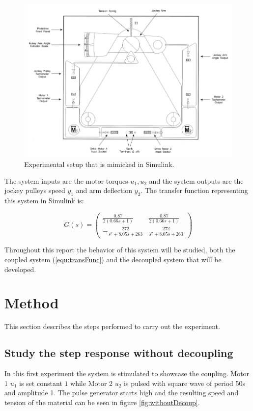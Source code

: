 \documentclass[a4paper, titlepage]{article}
\begin{document}
\begin{figure}[h!]
\center
\includegraphics[scale=0.65]{../figures/experimentSystem.png}
\caption{Experimental setup that is mimicked in Simulink.}
\label{fig:expSys}
\end{figure}

The system inputs are the motor torques $u_1, u_2$ and the system outputs are the jockey pulleys speed $y_1$ and arm deflection $y_2$.
The transfer function representing this system in Simulink is:

\begin{equation}
G(s) = 
\begin{pmatrix}
\frac{0.87}{2(0.66s + 1)} & \frac{0.87}{2(0.66s + 1)} \\[6pt]
-\frac{272}{s^2 + 8.05s + 263} & \frac{272}{s^2 + 8.05s + 263}
\end{pmatrix}
\label{equ:transFunc}
\end{equation}

Throughout this report the behavior of this system will be studied, both the coupled system (\ref{equ:transFunc}) and the decoupled system that will be developed.




\section{Method}
This section describes the steps performed to carry out the experiment.

\subsection{Study the step response without decoupling}
In this first experiment the system is stimulated to showcase the coupling.
Motor 1 $u_1$ is set constant $1$ while Motor 2 $u_2$ is pulsed with square wave of period 50s and amplitude 1.
The pulse generator starts high and the resulting speed and tension of the material can be seen in figure \ref{fig:withoutDecoup}.
\end{document}
